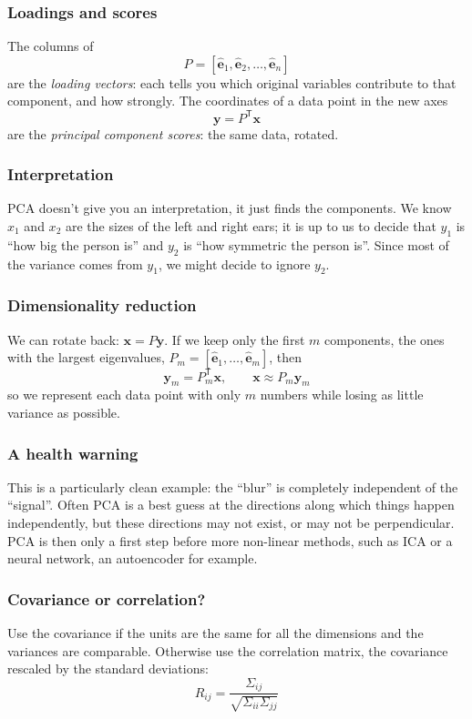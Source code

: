\documentclass{beamer}
\begin{document}
\begin{frame}
\frametitle{Loadings and scores}
\vskip 0.25cm
The columns of
$$
P=[\hat{\mathbf{e}}_1,\hat{\mathbf{e}}_2,\ldots,\hat{\mathbf{e}}_n]
$$
are the \emph{loading vectors}: each tells you which original variables contribute to that component, and how strongly.
\vskip 0.5cm
The coordinates of a data point in the new axes
$$
\mathbf{y}=P^{\mathsf T}\mathbf{x}
$$
are the \emph{principal component scores}: the same data, rotated.
\end{frame}

\begin{frame}
\frametitle{Interpretation}
\vskip 0.25cm
PCA doesn't give you an interpretation, it just finds the components.
\vskip 0.5cm
We know $x_1$ and $x_2$ are the sizes of the left and right ears; it is up to us to decide that $y_1$ is ``how big the person is'' and $y_2$ is ``how symmetric the person is''.
\vskip 0.5cm
Since most of the variance comes from $y_1$, we might decide to ignore $y_2$.
\end{frame}

\begin{frame}
\frametitle{Dimensionality reduction}
\vskip 0.25cm
We can rotate back: $\mathbf{x}=P\mathbf{y}$.
\vskip 0.5cm
If we keep only the first $m$ components, the ones with the largest eigenvalues, $P_m=[\hat{\mathbf{e}}_1,\ldots,\hat{\mathbf{e}}_m]$, then
$$
\mathbf{y}_m=P_m^{\mathsf T}\mathbf{x},
\qquad
\mathbf{x}\approx P_m\mathbf{y}_m
$$
so we represent each data point with only $m$ numbers while losing as little variance as possible.
\end{frame}

\begin{frame}
\frametitle{A health warning}
\vskip 0.25cm
This is a particularly clean example: the ``blur'' is completely independent of the ``signal''.
\vskip 0.5cm
Often PCA is a best guess at the directions along which things happen independently, but these directions may not exist, or may not be perpendicular.
\vskip 0.5cm
PCA is then only a first step before more non-linear methods, such as ICA or a neural network, an autoencoder for example.
\end{frame}

\begin{frame}
\frametitle{Covariance or correlation?}
\vskip 0.25cm
Use the covariance if the units are the same for all the dimensions and the variances are comparable.
\vskip 0.5cm
Otherwise use the correlation matrix, the covariance rescaled by the standard deviations:
$$
R_{ij}=\frac{\Sigma_{ij}}{\sqrt{\Sigma_{ii}\Sigma_{jj}}}
$$
\end{frame}
\end{document}
